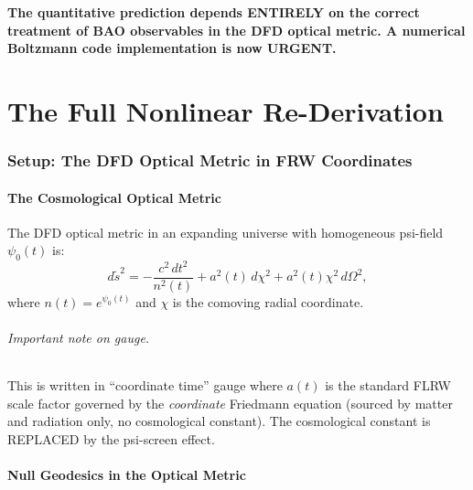 \documentclass[11pt,a4paper]{article}
\begin{document}
\begin{tcolorbox}[colback=yellow!5!white, colframe=red!70!black,
  title=\textbf{W4i14 TOP 5 FINDINGS --- RANKED BY IMPACT}]
\begin{enumerate}
  \textbf{The quantitative prediction depends ENTIRELY on the correct
  treatment of BAO observables in the DFD optical metric.
  A numerical Boltzmann code implementation is now URGENT.}

\end{enumerate}

\end{tcolorbox}


\part{The Full Nonlinear Re-Derivation}
\label{sec:full-derivation}

\section{Setup: The DFD Optical Metric in FRW Coordinates}

\subsection{The Cosmological Optical Metric}

The DFD optical metric in an expanding universe with homogeneous
psi-field $\psi_0(t)$ is:
\begin{equation}
d\tilde{s}^2 = -\frac{c^2\,dt^2}{n^2(t)} + a^2(t)\,d\chi^2
+ a^2(t)\chi^2\,d\Omega^2,
\label{eq:optical-frw}
\end{equation}
where $n(t) = e^{\psi_0(t)}$ and $\chi$ is the comoving radial coordinate.

\paragraph{Important note on gauge.} This is written in ``coordinate time''
gauge where $a(t)$ is the standard FLRW scale factor governed by the
\emph{coordinate} Friedmann equation (sourced by matter and radiation only,
no cosmological constant). The cosmological constant is REPLACED by the
psi-screen effect.

\subsection{Null Geodesics in the Optical Metric}
\end{document}
